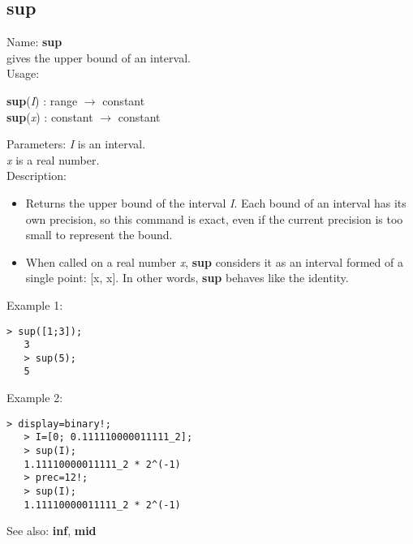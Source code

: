 \subsection{ sup }
\noindent Name: \textbf{sup}\\
gives the upper bound of an interval.\\

\noindent Usage: 
\begin{center}
\textbf{sup}(\emph{I}) : \textsf{range} $\rightarrow$ \textsf{constant}\\
\textbf{sup}(\emph{x}) : \textsf{constant} $\rightarrow$ \textsf{constant}\\
\end{center}
Parameters: 
\emph{I} is an interval.\\
\emph{x} is a real number.\\

\noindent Description: \begin{itemize}

\item Returns the upper bound of the interval \emph{I}. Each bound of an interval has its 
   own precision, so this command is exact, even if the current precision is too 
   small to represent the bound.

\item When called on a real number \emph{x}, \textbf{sup} considers it as an interval formed
   of a single point: [x, x]. In other words, \textbf{sup} behaves like the identity.
\end{itemize}
\noindent Example 1: 
\begin{center}\begin{minipage}{14.8cm}\begin{Verbatim}[frame=single]
   > sup([1;3]);
   3
   > sup(5);
   5
\end{Verbatim}
\end{minipage}\end{center}
\noindent Example 2: 
\begin{center}\begin{minipage}{14.8cm}\begin{Verbatim}[frame=single]
   > display=binary!;
   > I=[0; 0.111110000011111_2];
   > sup(I);
   1.11110000011111_2 * 2^(-1)
   > prec=12!;
   > sup(I);
   1.11110000011111_2 * 2^(-1)
\end{Verbatim}
\end{minipage}\end{center}
See also: \textbf{inf}, \textbf{mid}
